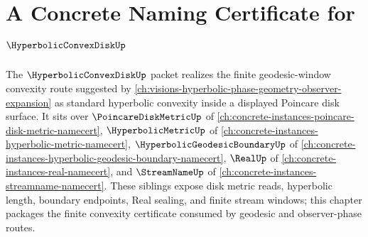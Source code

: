 \chapter{A Concrete Naming Certificate for $\HyperbolicConvexDiskUp$}
\label{ch:concrete-instances-hyperbolic-convex-disk-namecert}

The $\HyperbolicConvexDiskUp$ packet realizes the finite geodesic-window convexity route suggested by \autoref{ch:visions-hyperbolic-phase-geometry-observer-expansion} as standard hyperbolic convexity inside a displayed Poincare disk surface. It sits over $\PoincareDiskMetricUp$ of \autoref{ch:concrete-instances-poincare-disk-metric-namecert}, $\HyperbolicMetricUp$ of \autoref{ch:concrete-instances-hyperbolic-metric-namecert}, $\HyperbolicGeodesicBoundaryUp$ of \autoref{ch:concrete-instances-hyperbolic-geodesic-boundary-namecert}, $\RealUp$ of \autoref{ch:concrete-instances-real-namecert}, and $\StreamNameUp$ of \autoref{ch:concrete-instances-streamname-namecert}. These siblings expose disk metric reads, hyperbolic length, boundary endpoints, Real sealing, and finite stream windows; this chapter packages the finite convexity certificate consumed by geodesic and observer-phase routes.

